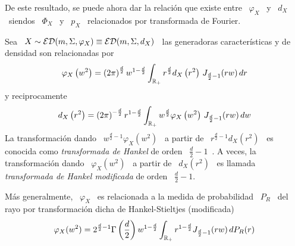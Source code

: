 De  este  resultado,  se puede  ahora  dar  la  relaci\'on  que existe  entre  \
$\varphi_X$ \  y \ $d_X$  \ siendos \  $\Phi_X$ \ y  \ $p_X$ \  relacionados por
transformada de Fourier.
%
\begin{teorema}\label{Teo:MP:TransformadaDeHankel}
%
  Sea  \  $X  \sim   \mathcal{ED}(m,\Sigma,\varphi_X)  \equiv  \mathcal{ED}(m,\Sigma,d_X)$  \  las
  generadoras caracter\'isticas y de densidad son relacionadas por
  \[
  \varphi_X\left(   w^2   \right)   =   \left(   2   \pi   \right)^{\frac{d}{2}}
  w^{1-\frac{d}{2}}  \int_{\mathbb{R}_+}  r^{\frac{d}{2}}  d_X\left( r^2  \right)  \,
  J_{\frac{d}{2}-1}( r w) \, dr
  \]
  y reciprocamente
  \[
  d_X\left( r^2 \right) =  \left( 2 \pi \right)^{-\frac{d}{2}} r^{1-\frac{d}{2}}
  \int_{\mathbb{R}_+}     w^{\frac{d}{2}}    \varphi_X\left(    w^2     \right)    \,
  J_{\frac{d}{2}-1}( r w) \, dw
  \]
  La transformaci\'on dando \  $w^{\frac{d}{2}-1} \varphi_X\left( w^2 \right)$ \
  a partir  de \  $r^{\frac{d}{2}-1} d_X\left( r^2  \right)$ \ es  conocida como
  {\em transformada  de Hankel}  de orden \  $\frac{d}{2}-1$~\cite{Sch38, Sch69,
    Sch71,  Lor54,   Pou99,  Pou10}.  A  veces,  la   transformaci\'on  dando  \
  $\varphi_X\left( w^2  \right)$ \ a  partir de \  $d_X\left( r^2 \right)$  \ es
  llamada {\em transformada de Hankel modificada} de orden \ $\frac{d}{2}-1$.

  M\'as generalmente, \ $\varphi_X$ \ es relacionada a la medida de probabilidad
  \   $P_R$  \  del   rayo  por   transformaci\'on  dicha   de  Hankel-Stieltjes
  (modificada)~\cite{Sch38, Nus73, ChoHai70, Sch71}
  \[
  \varphi_X(w^2)   =    2^{\frac{d}{2}-1}   \Gamma\left(   \frac{d}{2}   \right)
  w^{1-\frac{d}{2}}  \int_{\mathbb{R}_+} r^{1-\frac{d}{2}} J_{\frac{d}{2}-1}(r  w) \,
  dP_R(r)
  \]
\end{teorema}
%
